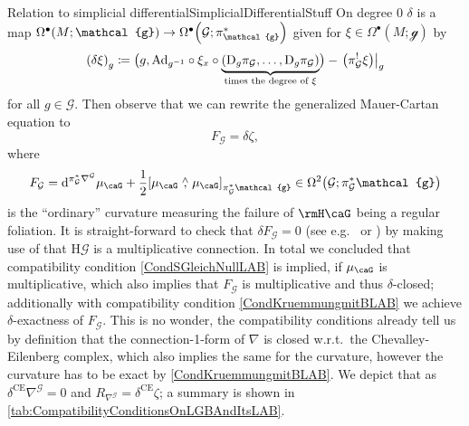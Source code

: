 \documentclass[reqno,a4paper,oneside]{amsart}
\newcommand\mutot{\mu_\caG}
\theoremstyle{plain}
\theoremstyle{remark}
\theoremstyle{definition}
\begin{document}
\begin{remarks}{Relation to simplicial differential}{SimplicialDifferentialStuff}
On degree 0 $\delta$ is a map $\Omega^\bullet(M; \mathcal{g}) \to \Omega^\bullet\mleft(\mathcal{G}; \pi^{*}_{\mathcal{g}}\mright)$ given for $\xi \in \Omega^\bullet(M; \mathcal{g})$ by
\begin{equation*}
\mleft(\delta\xi\mright)_g
\coloneqq
\bigl( g, \mathrm{Ad}_{g^{-1}} \circ \xi_x \circ {\underbrace{\mleft(\mathrm{D}_g \pi_{\mathcal{G}}, \dotsc, \mathrm{D}_g \pi_{\mathcal{G}}\mright)}_{ \text{times the degree of $\xi$} }} \bigr)
	- \mleft.\mleft(\pi_{\mathcal{G}}^! \xi\mright)\mright|_g
\end{equation*}
for all $g\in \mathcal{G}$. Then observe that we can rewrite the generalized Mauer-Cartan equation to
\begin{equation*}
F_{\mathcal{G}}
=
\delta \zeta,
\end{equation*}
where
\begin{equation*}
F_{\mathcal{G}}
=
\mathrm{d}^{\pi_{\mathcal{G}}^*\nabla^{\mathcal{G}}} \mutot
	+ \frac{1}{2} \mleft[ \mutot \stackrel{\wedge}{,} \mutot \mright]_{\pi_{\mathcal{G}}^*\mathcal{g}}
\in \Omega^2\mleft( \mathcal{G}; \pi_{\mathcal{G}}^*\mathcal{g} \mright)
\end{equation*}
is the ``ordinary'' curvature measuring the failure of $\rmH \caG$ being a regular foliation.
It is straight-forward to check that $\delta F_{\mathcal{G}} = 0$ (see e.g.\ \cite[\S 4.6, Thm.\ 4.27, Eq.\ (53)]{LAURENTGENGOUXStienonXuMultiplicativeForms} or \cite[\S 2.5, Prop.\ 2.22]{FernandesMarcutMultiplicativeForms}) by making use of that $\mathrm{H}\mathcal{G}$ is a multiplicative connection. In total we concluded that compatibility condition \eqref{CondSGleichNullLAB} is implied, if $\mutot$ is multiplicative, which also implies that $F_{\mathcal{G}}$ is multiplicative and thus $\delta$-closed; additionally with compatibility condition \eqref{CondKruemmungmitBLAB} we achieve $\delta$-exactness of $F_{\mathcal{G}}$. This is no wonder, the compatibility conditions already tell us by definition that the connection-1-form of $\nabla$ is closed w.r.t.\ the Chevalley-Eilenberg complex, which also implies the same for the curvature, however the curvature has to be exact by \eqref{CondKruemmungmitBLAB}. We depict that as $\delta^{\mathrm{CE}}\nabla^{\mathcal{G}} = 0$ and $R_{\nabla^{\mathcal{G}}} = \delta^{\mathrm{CE}}\zeta$; a summary is shown in \ref{tab:CompatibilityConditionsOnLGBAndItsLAB}.
\end{remarks}
\end{document}
